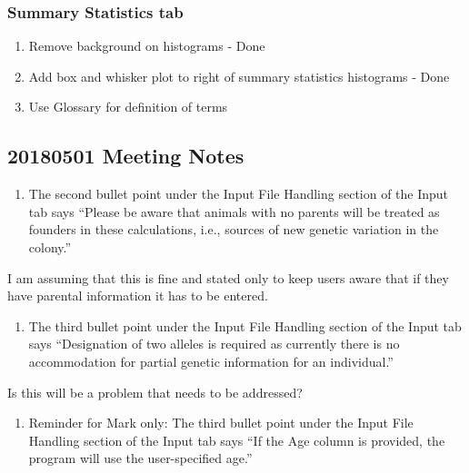 \documentclass[
]{article}
\providecommand{\tightlist}{%
  \setlength{\itemsep}{0pt}\setlength{\parskip}{0pt}}
\begin{document}
\hypertarget{summary-statistics-tab-1}{%
\subsubsection{Summary Statistics tab}\label{summary-statistics-tab-1}}

\begin{enumerate}
\def\labelenumi{\arabic{enumi}.}
\tightlist
\item
  Remove background on histograms - Done
\item
  Add box and whisker plot to right of summary statistics histograms -
  Done
\item
  Use Glossary for definition of terms
\end{enumerate}

\hypertarget{meeting-notes-2}{%
\subsection{20180501 Meeting Notes}\label{meeting-notes-2}}

\begin{enumerate}
\def\labelenumi{\arabic{enumi}.}
\tightlist
\item
  The second bullet point under the Input File Handling section of the
  Input tab says ``Please be aware that animals with no parents will be
  treated as founders in these calculations, i.e., sources of new
  genetic variation in the colony.''
\end{enumerate}

I am assuming that this is fine and stated only to keep users aware that
if they have parental information it has to be entered.

\begin{enumerate}
\def\labelenumi{\arabic{enumi}.}
\setcounter{enumi}{1}
\tightlist
\item
  The third bullet point under the Input File Handling section of the
  Input tab says ``Designation of two alleles is required as currently
  there is no accommodation for partial genetic information for an
  individual.''
\end{enumerate}

Is this will be a problem that needs to be addressed?

\begin{enumerate}
\def\labelenumi{\arabic{enumi}.}
\setcounter{enumi}{2}
\tightlist
\item
  Reminder for Mark only: The third bullet point under the Input File
  Handling section of the Input tab says ``If the Age column is
  provided, the program will use the user-specified age.''
\end{enumerate}
\end{document}
